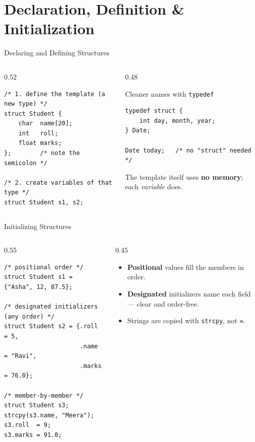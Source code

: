 \documentclass[aspectratio=169]{beamer}
\begin{document}
	\section{Declaration, Definition \& Initialization}
	\begin{frame}[fragile]{Declaring and Defining Structures}
		\begin{columns}[T]
			\begin{column}{0.52\textwidth}
				\begin{lstlisting}
/* 1. define the template (a new type) */
struct Student {
    char  name[20];
    int   roll;
    float marks;
};        /* note the semicolon */

/* 2. create variables of that type */
struct Student s1, s2;
				\end{lstlisting}
			\end{column}
			\begin{column}{0.48\textwidth}
				\begin{block}{Cleaner names with \texttt{typedef}}
					\small
				\end{block}
				\begin{lstlisting}
typedef struct {
    int day, month, year;
} Date;

Date today;   /* no "struct" needed */
				\end{lstlisting}
				\footnotesize The template itself uses \textbf{no memory}; each \emph{variable} does.
			\end{column}
		\end{columns}
	\end{frame}

	\begin{frame}[fragile]{Initializing Structures}
		\begin{columns}[T]
			\begin{column}{0.55\textwidth}
				\begin{lstlisting}
/* positional order */
struct Student s1 = {"Asha", 12, 87.5};

/* designated initializers (any order) */
struct Student s2 = {.roll = 5,
                     .name = "Ravi",
                     .marks = 76.0};

/* member-by-member */
struct Student s3;
strcpy(s3.name, "Meera");
s3.roll  = 9;
s3.marks = 91.0;
				\end{lstlisting}
			\end{column}
			\begin{column}{0.45\textwidth}
				\begin{itemize}\small
					\item \textbf{Positional} values fill the members in order.
					\item \textbf{Designated} initializers name each field --- clear and order-free.
					\item Strings are copied with \texttt{strcpy}, not \texttt{=}.
				\end{itemize}
			\end{column}
		\end{columns}
	\end{frame}
\end{document}
